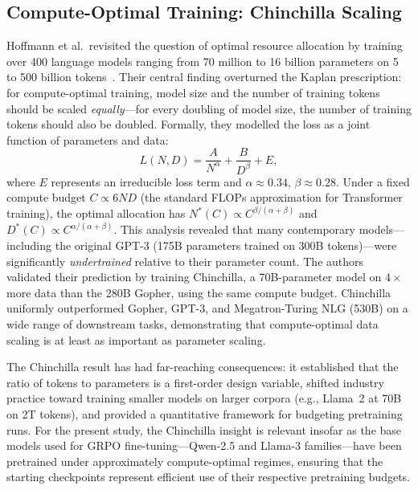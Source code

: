 \subsection{Compute-Optimal Training: Chinchilla Scaling}

Hoffmann et al.\ revisited the question of optimal resource allocation by
training over 400 language models ranging from 70 million to 16 billion
parameters on 5 to 500 billion tokens~\cite{hoffmann2022chinchilla}.  Their
central finding overturned the Kaplan prescription: for compute-optimal
training, model size and the number of training tokens should be scaled
\emph{equally}---for every doubling of model size, the number of training tokens
should also be doubled.  Formally, they modelled the loss as a joint function of
parameters and data:
\begin{equation}
  L(N, D) = \frac{A}{N^{\alpha}} + \frac{B}{D^{\beta}} + E,
  \label{eq:chinchilla}
\end{equation}
where $E$ represents an irreducible loss term and $\alpha \approx 0.34$,
$\beta \approx 0.28$.  Under a fixed compute budget $C \propto 6ND$ (the
standard FLOPs approximation for Transformer training), the optimal allocation
has $N^*(C)\propto C^{\beta/(\alpha+\beta)}$ and $D^*(C)\propto C^{\alpha/(\alpha+\beta)}$.  This analysis revealed that
many contemporary models---including the original GPT-3 (175B parameters
trained on 300B tokens)---were significantly \emph{undertrained} relative to
their parameter count.  The authors validated their prediction by training
Chinchilla, a 70B-parameter model on $4\times$ more data than the 280B Gopher,
using the same compute budget.  Chinchilla uniformly outperformed Gopher,
GPT-3, and Megatron-Turing NLG (530B) on a wide range of downstream tasks,
demonstrating that compute-optimal data scaling is at least as important as
parameter scaling.

The Chinchilla result has had far-reaching consequences: it established that
the ratio of tokens to parameters is a first-order design variable, shifted
industry practice toward training smaller models on larger corpora (e.g.,
Llama~2 at 70B on 2T tokens), and provided a quantitative framework for
budgeting pretraining runs.  For the present study, the Chinchilla insight is
relevant insofar as the base models used for GRPO fine-tuning---Qwen-2.5 and
Llama-3 families---have been pretrained under approximately compute-optimal
regimes, ensuring that the starting checkpoints represent efficient use of their
respective pretraining budgets.


